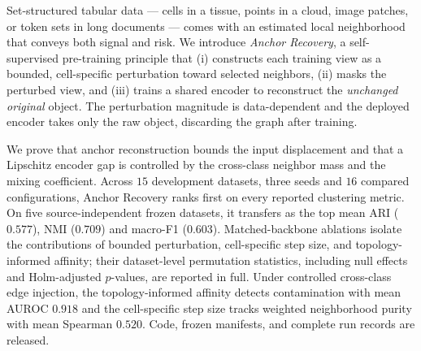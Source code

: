 Set-structured tabular data --- cells in a tissue, points in a cloud, image
patches, or token sets in long documents --- comes with an estimated local
neighborhood that conveys both signal and risk. We introduce
\emph{Anchor Recovery}, a self-supervised pre-training principle that
(i) constructs each training view as a bounded, cell-specific perturbation
toward selected neighbors, (ii) masks the perturbed view, and (iii) trains a
shared encoder to reconstruct the \emph{unchanged original} object. The
perturbation magnitude is data-dependent and the deployed encoder takes only
the raw object, discarding the graph after training.

We prove that anchor reconstruction bounds the input displacement and that
a Lipschitz encoder gap is controlled by the cross-class neighbor mass and
the mixing coefficient. Across $15$ development datasets, three seeds and
$16$ compared configurations, Anchor Recovery ranks first on every reported
clustering metric.
On five source-independent frozen datasets, it transfers as the top mean
ARI ($0.577$), NMI ($0.709$) and macro-F1 ($0.603$). Matched-backbone
ablations isolate the contributions of bounded perturbation, cell-specific
step size, and topology-informed affinity; their dataset-level permutation
statistics, including null effects and Holm-adjusted $p$-values, are reported
in full. Under controlled cross-class edge injection, the topology-informed
affinity detects contamination with mean AUROC $0.918$ and the cell-specific
step size tracks weighted neighborhood purity with mean Spearman $0.520$.
Code, frozen manifests, and complete run records are released.
